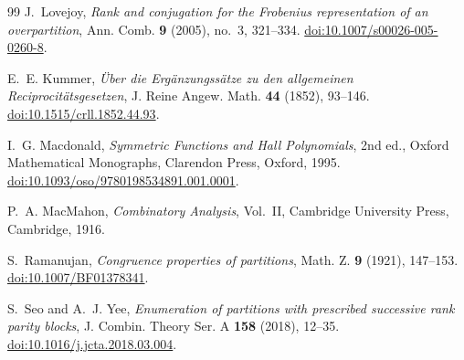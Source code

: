 \documentclass[11pt]{article}
\theoremstyle{definition}
\theoremstyle{remark}
\begin{document}
\begin{thebibliography}{99}
J.~Lovejoy,
\emph{Rank and conjugation for the Frobenius representation of an overpartition},
Ann. Comb. \textbf{9} (2005), no.~3, 321--334.
\href{https://doi.org/10.1007/s00026-005-0260-8}{doi:10.1007/s00026-005-0260-8}.

E.~E. Kummer,
\emph{\"Uber die Erg\"anzungss\"atze zu den allgemeinen Reciprocit\"atsgesetzen},
J. Reine Angew. Math. \textbf{44} (1852), 93--146.
\href{https://doi.org/10.1515/crll.1852.44.93}{doi:10.1515/crll.1852.44.93}.

I.~G. Macdonald,
\emph{Symmetric Functions and Hall Polynomials}, 2nd ed.,
Oxford Mathematical Monographs, Clarendon Press, Oxford, 1995.
\href{https://doi.org/10.1093/oso/9780198534891.001.0001}{doi:10.1093/oso/9780198534891.001.0001}.

P.~A. MacMahon,
\emph{Combinatory Analysis}, Vol.~II,
Cambridge University Press, Cambridge, 1916.

S.~Ramanujan,
\emph{Congruence properties of partitions},
Math. Z. \textbf{9} (1921), 147--153.
\href{https://doi.org/10.1007/BF01378341}{doi:10.1007/BF01378341}.

S.~Seo and A.~J. Yee,
\emph{Enumeration of partitions with prescribed successive rank parity blocks},
J. Combin. Theory Ser. A \textbf{158} (2018), 12--35.
\href{https://doi.org/10.1016/j.jcta.2018.03.004}{doi:10.1016/j.jcta.2018.03.004}.

\end{thebibliography}
\end{document}
